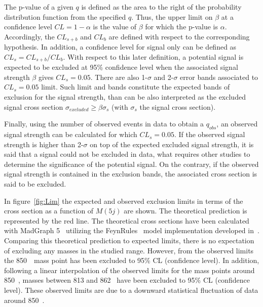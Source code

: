 The p-value of a given $q$ is defined as the area to the right of the probability distribution function from the specified $q$. Thus, the upper limit on $\beta$ at a confidence level $CL=1-\alpha$ is the value of $\beta$ for which the p-value is $\alpha$. Accordingly, the $CL_{s+b}$ and $CL_{b}$ are defined with respect to the corresponding hypothesis. In addition, a confidence level for signal only can be defined as $CL_{s}=CL_{s+b}/CL_{b}$. With respect to this later definition, a potential signal is expected to be excluded at 95\% confidence level when the associated signal strength $\beta$ gives $CL_{s}=0.05$. There are also 1-$\sigma$ and 2-$\sigma$ error bands associated to $CL_{s}=0.05$ limit. Such limit and bands constitute the expected bands of exclusion for the signal strength, than can be also interpreted as the excluded signal cross section $\sigma_{excluded}\ge \beta\sigma_{s}$ (with $\sigma_{s}$ the signal cross section). 

Finally, using the number of observed events in data to obtain a $q_{obs}$, an observed signal strength can be calculated for which $CL_{s}=0.05$. If the observed signal strength is higher than 2-$\sigma$ on top of the expected excluded signal strength, it is said that a signal could not be excluded in data, what requires other studies to determine the significance of the potential signal. On the contrary, if the observed signal strength is contained in the exclusion bands, the associated cross section is said to be excluded. 

In figure~\ref{fig:Lim} the expected and observed exclusion limits in terms of the cross section as a function of $M(5j)$ are shown. The theoretical prediction is represented by the red line. The theoretical cross sections have been calculated with MadGraph 5~\cite{Alwall:2014hca, Alwall:2011uj} utilizing the FeynRules~\cite{Alloul:2013bka} model implementation developed in~\cite{Buchkremer:2013bha, Cacciapaglia:2011fx}. Comparing this theoretical prediction to expected limits, there is no expectation of excluding any masses in the studied range. However, from the observed limits the 850~\GeVcc~mass point has been excluded to 95\% CL (confidence level). In addition, following a linear interpolation of the observed limits for the mass points around 850~\GeVcc, masses between 813 and 862 \GeVcc~have been excluded to 95\% CL (confidence level). These observed limits are due to a downward statistical fluctuation of data around 850~\GeVcc. 

